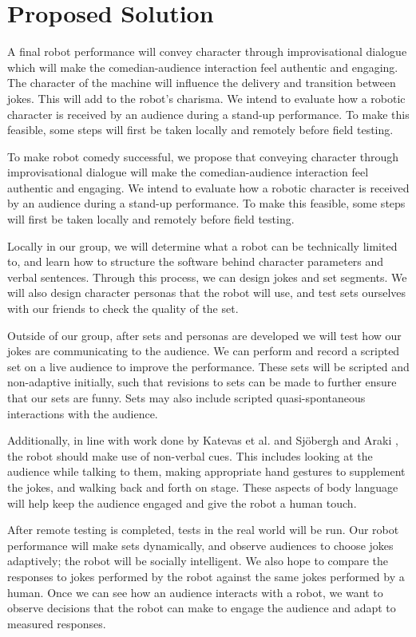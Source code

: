 \documentclass[onecolumn, draftclsnofoot,10pt, compsoc]{IEEEtran}
\begin{document}
\section{Proposed Solution}

	
A final robot performance will convey character through improvisational dialogue which will make the comedian-audience interaction feel authentic and engaging. The character of the machine will influence the delivery and transition between jokes. This will add to the robot's charisma. We intend to evaluate how a robotic character is received by an audience during a stand-up performance. To make this feasible, some steps will first be taken locally and remotely before field testing. 


To make robot comedy successful, we propose that conveying character through improvisational dialogue will make the comedian-audience interaction feel authentic and engaging. We intend to evaluate how a robotic character is received by an audience during a stand-up performance. To make this feasible, some steps will first be taken locally and remotely before field testing. 

	Locally in our group, we will determine what a robot can be technically limited to, and learn how to structure the software behind character parameters and verbal sentences. Through this process, we can design jokes and set segments. We will also design character personas that the robot will use, and test sets ourselves with our friends to check the quality of the set. 

	Outside of our group, after sets and personas are developed we will test how our jokes are communicating to the audience. We can perform and record a scripted set on a live audience to improve the performance. These sets will be scripted and non-adaptive initially, such that revisions to sets can be made to further ensure that our sets are funny. Sets may also include scripted quasi-spontaneous interactions with the audience. 

Additionally, in line with work done by Katevas et al. {\cite{RobotComedyLab:2015}} and Sj{\"o}bergh and Araki {\cite{RobotsMakeThings:2008}}, the robot should make use of non-verbal cues. This includes looking at the audience while talking to them, making appropriate hand gestures to supplement the jokes, and walking back and forth on stage. These aspects of body language will help keep the audience engaged and give the robot a human touch. 

	After remote testing is completed, tests in the real world will be run. Our robot performance will make sets dynamically, and observe audiences to choose jokes adaptively; the robot will be socially intelligent. We also hope to compare the responses to jokes performed by the robot against the same jokes performed by a human. Once we can see how an audience interacts with a robot, we want to observe decisions that the robot can make to engage the audience and adapt to measured responses. 
\end{document}
